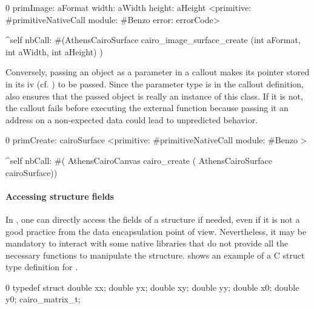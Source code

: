 \begin{stcode}[
	label={lst:ffi-calloutOpaqueStruct},
	caption={Example of returning a structure by reference}]{0}
primImage: aFormat width: aWidth height: aHeight
	<primitive: #primitiveNativeCall
	 module: #Benzo
     error: errorCode>

	^self nbCall: #(AthensCairoSurface
		cairo_image_surface_create (int aFormat,
									int aWidth,
									int aHeight) )
\end{stcode}

\noindent Conversely, passing an  object as a parameter in a callout makes its pointer stored in its  iv (cf. ) to be passed.
Since the parameter type is  in the callout definition, \NB also ensures that the passed object is really an instance of this class.
If it is not, the callout fails before executing the external function because passing it an address on a non-expected data could lead to unpredicted behavior.

\begin{stcode}[
	label={lst:ffi-calloutOpaqueStructParameter},
	caption={Example of passing a structure by reference}]{0}
primCreate: cairoSurface
	<primitive: #primitiveNativeCall module: #Benzo >

	^self nbCall: #(
        AthensCairoCanvas cairo_create (
                  AthensCairoSurface cairoSurface))
\end{stcode}


\paragraph{Accessing structure fields}
In \NB, one can directly access the fields of a structure if needed, even if it is not a good practice from the data encapsulation point of view.
Nevertheless, it may be mandatory to interact with some native libraries that do not provide all the necessary functions to manipulate the structure.
 shows an example of a C struct type definition for .

\begin{numstcode}[
	label={lst:ffi-cairo_c_definition},
	caption={Example external type to convert back and forth with the Cairo library}]{0}
typedef struct {
    double xx; double yx;
    double xy; double yy;
    double x0; double y0;
} cairo_matrix_t;
\end{numstcode}

